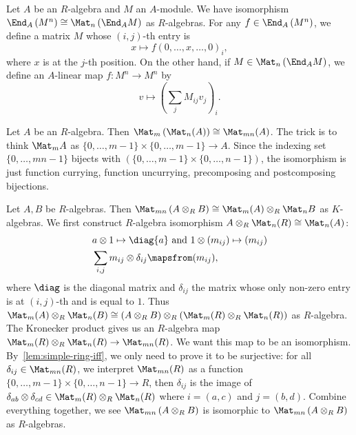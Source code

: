 \begin{construction}
  \label{con:end-vec-iso-matrix}
  Let $A$ be an $R$-algebra and $M$ an $A$-module. We have isomorphism
  $\End_{A}\left(M^{n}\right)\cong \Mat_{n}\left(\End_{A}M\right)$ as
  $R$-algebras. For any $f \in \End_{A}\left(M^{n}\right)$, we define a matrix
  $M$ whose $(i,j)$-th entry is
  \[
    x \mapsto f\left(0,\dots,x,\dots,0\right)_{i},
  \]
  where $x$ is at the $j$-th position. On the other hand, if
  $M \in \Mat_{n}\left(\End_{A}M\right)$, we define an $A$-linear map
  $f : M^{n}\to M^{n}$ by
  \[
    v \mapsto \left(\sum_{j}M_{ij}v_{j}\right)_{i}.
  \]
  \leanok
\end{construction}

\begin{construction}
  \label{con:matrix-matrix}
  Let $A$ be an $R$-algebra. Then $\Mat_{m}\left(\Mat_{n}(A)\right) \cong \Mat_{mn}(A)$.
  The trick is to think $\Mat_{m}A$ as $\{0,\dots,m-1\} \times \{0,\dots,m-1\} \to A$. Since the indexing set $\{0,\dots,mn-1\}$ bijects with $\left(\{0,\dots,m-1\}\times\{0,\dots,n-1\}\right)$, the isomorphism is just function currying, function uncurrying, precomposing and postcomposing bijections.
  \leanok
\end{construction}

\begin{construction}
  \label{con:matrix-tensor-matrix}
  Let $A, B$ be $R$-algebras. Then $\Mat_{mn}\left(A\otimes_{R}B\right)\cong\Mat_{m}(A)\otimes_{R}\Mat_{n}B$ as $K$-algebras. We first construct $R$-algebra isomorphism $A \otimes_{R}\Mat_{n}(R) \cong \Mat_{n}(A)$:
  \[
    \begin{aligned}
      & a \otimes 1 \mapsto \diag{a}~\text{and}~ 1\otimes (m_{ij}) \mapsto (m_{ij})\\
      & \sum_{i,j} m_{ij}\otimes \delta_{ij}\mapsfrom (m_{ij}),
    \end{aligned}
  \]
  where $\diag$ is the diagonal matrix and $\delta_{ij}$ the matrix whose only non-zero entry is at $(i,j)$-th and is equal to $1$.
  Thus $\Mat_{m}(A)\otimes_{R}\Mat_{n}(B)\cong \left(A\otimes_{R}B\right)\otimes_{R} \left(\Mat_{m}(R)\otimes_{R} \Mat_{n}(R)\right)$ as $R$-algebra.
  The Kronecker product gives us an $R$-algebra map $\Mat_{m}(R)\otimes_{R}\Mat_{n}(R) \to \Mat_{mn}(R)$. We want this map to be an isomorphism. By~\cref{lem:simple-ring-iff}, we only need to prove it to be surjective: for all $\delta_{ij} \in \Mat_{mn}(R)$, we interpret $\Mat_{mn}(R)$ as a function $\{0,\dots,m-1\}\times\{0,\dots,n-1\}\to R$, then $\delta_{ij}$ is the image of $\delta_{ab}\otimes \delta_{cd} \in \Mat_{m}(R)\otimes_{R}\Mat_{n}(R)$ where $i = (a, c)$ and $j = (b,d)$. Combine everything together, we see $\Mat_{mn}\left(A\otimes_{R}B\right)$ is isomorphic to $\Mat_{mn}\left(A\otimes_{R} B\right)$ as $R$-algebras.
  \leanok
\end{construction}

